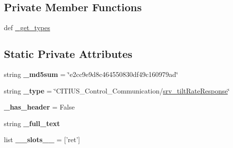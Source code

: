 \subsection*{\-Private \-Member \-Functions}
\begin{DoxyCompactItemize}
\item 
def \hyperlink{class_c_i_t_i_u_s___control___communication_1_1srv_1_1__srv__tilt_rate_1_1srv__tilt_rate_response_a2c67ace713a00eaa9b06275efbbc5ff4}{\-\_\-get\-\_\-types}
\end{DoxyCompactItemize}
\subsection*{\-Static \-Private \-Attributes}
\begin{DoxyCompactItemize}
\item 
\hypertarget{class_c_i_t_i_u_s___control___communication_1_1srv_1_1__srv__tilt_rate_1_1srv__tilt_rate_response_a4ae311cbca0226e42635c0889c389570}{string {\bfseries \-\_\-md5sum} = \char`\"{}e2cc9e9d8c464550830df49c160979ad\char`\"{}}\label{class_c_i_t_i_u_s___control___communication_1_1srv_1_1__srv__tilt_rate_1_1srv__tilt_rate_response_a4ae311cbca0226e42635c0889c389570}

\item 
\hypertarget{class_c_i_t_i_u_s___control___communication_1_1srv_1_1__srv__tilt_rate_1_1srv__tilt_rate_response_ab72e7b55c14da912fd82cd9a75b71f3d}{string {\bfseries \-\_\-type} = \char`\"{}\-C\-I\-T\-I\-U\-S\-\_\-\-Control\-\_\-\-Communication/\hyperlink{class_c_i_t_i_u_s___control___communication_1_1srv_1_1__srv__tilt_rate_1_1srv__tilt_rate_response}{srv\-\_\-tilt\-Rate\-Response}\char`\"{}}\label{class_c_i_t_i_u_s___control___communication_1_1srv_1_1__srv__tilt_rate_1_1srv__tilt_rate_response_ab72e7b55c14da912fd82cd9a75b71f3d}

\item 
\hypertarget{class_c_i_t_i_u_s___control___communication_1_1srv_1_1__srv__tilt_rate_1_1srv__tilt_rate_response_a8a23c3ed30b6c3928cdcd56064a3cf2e}{{\bfseries \-\_\-has\-\_\-header} = \-False}\label{class_c_i_t_i_u_s___control___communication_1_1srv_1_1__srv__tilt_rate_1_1srv__tilt_rate_response_a8a23c3ed30b6c3928cdcd56064a3cf2e}

\item 
string {\bfseries \-\_\-full\-\_\-text}
\item 
\hypertarget{class_c_i_t_i_u_s___control___communication_1_1srv_1_1__srv__tilt_rate_1_1srv__tilt_rate_response_a48f20dc1400feb384b797cf4251a7a4e}{list {\bfseries \-\_\-\-\_\-slots\-\_\-\-\_\-} = \mbox{[}'ret'\mbox{]}}\label{class_c_i_t_i_u_s___control___communication_1_1srv_1_1__srv__tilt_rate_1_1srv__tilt_rate_response_a48f20dc1400feb384b797cf4251a7a4e}


\end{DoxyCompactItemize}
